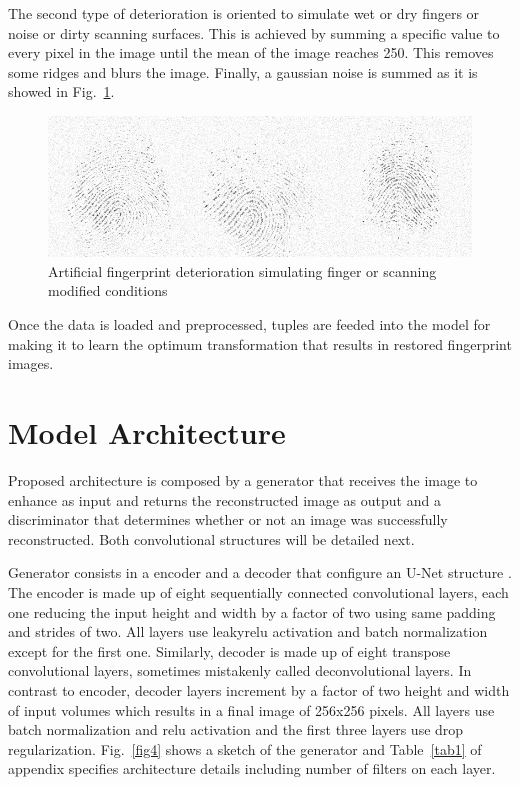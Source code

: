 \documentclass[a4paper,fleqn]{cas-dc}
\begin{document}
The second type of deterioration is oriented to simulate wet or dry fingers or noise or dirty scanning surfaces. This is achieved by summing a specific value to every pixel in the image until the mean of the image reaches 250. This removes some ridges and blurs the image. Finally, a gaussian noise is summed as it is showed in Fig.~\ref{fig3}.

\begin{figure}[htbp]
\centerline{\includegraphics[scale=0.32]{figs/deterioration_2.png}}
\caption{Artificial fingerprint deterioration simulating finger or scanning modified conditions}
\label{fig3}
\end{figure}

Once the data is loaded and preprocessed, tuples are feeded into the model for making it to learn the optimum transformation that results in restored fingerprint images.

\section{Model Architecture}
\label{sec:MA}

Proposed architecture is composed by a generator that receives the image to enhance as input and returns the reconstructed image as output and a discriminator that determines whether or not an image was successfully reconstructed. Both convolutional structures will be detailed next.

Generator consists in a encoder and a decoder that configure an U-Net structure \cite{UNBIS}. The encoder is made up of eight sequentially connected convolutional layers, each one reducing the input height and width by a factor of two using same padding and strides of two. All layers use leakyrelu activation and batch normalization except for the first one. Similarly, decoder is made up of eight transpose convolutional layers, sometimes mistakenly called deconvolutional layers. In contrast to encoder, decoder layers increment by a factor of two height and width of input volumes which results in a final image of 256x256 pixels. All layers use batch normalization and relu activation and the first three layers use drop regularization. Fig.~\ref{fig4} shows a sketch of the generator and Table~\ref{tab1} of appendix specifies architecture details including number of filters on each layer.
\end{document}
